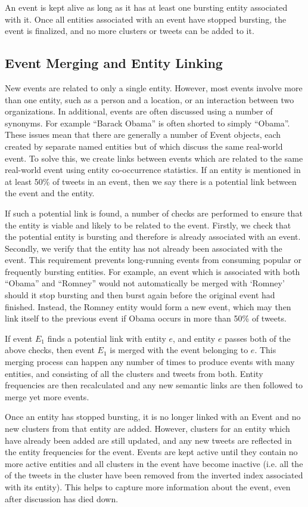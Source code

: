 An event is kept alive as long as it has at least one bursting entity associated with it. Once all entities associated with an event have stopped bursting, the event is finalized, and no more clusters or tweets can be added to it.

\subsection{Event Merging and Entity Linking}
\label{detection:sec:entityLinking}
New events are related to only a single entity.
However, most events involve more than one entity, such as a person and a location, or an interaction between two organizations.
In additional, events are often discussed using a number of synonyms.
For example ``Barack Obama'' is often shorted to simply ``Obama''.
These issues mean that there are generally a number of Event objects, each created by separate named entities but of which discuss the same real-world event.
To solve this, we create links between events which are related to the same real-world event using entity co-occurrence statistics.
If an entity is mentioned in at least 50\% of tweets in an event, then we say there is a potential link between the event and the entity.

If such a potential link is found, a number of checks are performed to ensure that the entity is viable and likely to be related to the event. Firstly, we check that the potential entity is bursting and therefore is already associated with an event. Secondly, we verify that the entity has not already been associated with the event. This requirement prevents long-running events from consuming popular or frequently bursting entities. For example, an event which is associated with both ``Obama'' and ``Romney'' would not automatically be merged with `Romney' should it stop bursting and then burst again before the original event had finished. Instead, the Romney entity would form a new event, which may then link itself to the previous event if Obama occurs in more than 50\% of tweets.

If event $E_{1}$ finds a potential link with entity $e$, and entity $e$ passes both of the above checks, then event $E_1$ is merged with the event belonging to $e$. This merging process can happen any number of times to produce events with many entities, and consisting of all the clusters and tweets from both.
Entity frequencies are then recalculated and any new semantic links are then followed to merge yet more events.

Once an entity has stopped bursting, it is no longer linked with an Event and no new clusters from that entity are added.
However, clusters for an entity which have already been added are still updated, and any new tweets are reflected in the entity frequencies for the event.
Events are kept active until they contain no more active entities and all clusters in the event have become inactive (i.e. all the of the tweets in the cluster have been removed from the inverted index associated with its entity).
This helps to capture more information about the event, even after discussion has died down.

